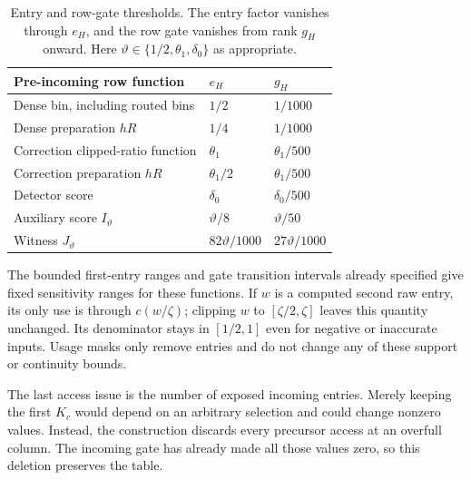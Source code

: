 \begin{table}[htbp]
\centering
\begin{tabular}{@{}lll@{}}
\toprule
Pre-incoming row function & $e_H$ & $g_H$ \\
\midrule
Dense bin, including routed bins & $1/2$ & $1/1000$ \\
Dense preparation $hR$ & $1/4$ & $1/1000$ \\
Correction clipped-ratio function & $\theta_1$ & $\theta_1/500$ \\
Correction preparation $hR$ & $\theta_1/2$ & $\theta_1/500$ \\
Detector score & $\delta_0$ & $\delta_0/500$ \\
Auxiliary score $I_{\vartheta}$ & $\vartheta/8$ & $\vartheta/50$ \\
Witness $J_{\vartheta}$ & $82\vartheta/1000$ & $27\vartheta/1000$ \\
\bottomrule
\end{tabular}
\caption{Entry and row-gate thresholds. The entry factor vanishes through
$e_H$, and the row gate vanishes from rank $g_H$ onward. Here
$\vartheta\in\{1/2,\theta_1,\delta_0\}$ as appropriate.}
\label{tab:atom-compression-thresholds}
\end{table}

The bounded first-entry ranges and gate transition intervals already
specified give fixed sensitivity ranges for these functions.  If $w$
is a computed second raw entry, its only use is through $c(w/\zeta)$;
clipping $w$ to $[\zeta/2,\zeta]$ leaves this quantity unchanged.
Its denominator stays in $[1/2,1]$ even for negative or inaccurate
inputs.  Usage masks only remove entries and do not change any of these
support or continuity bounds.

The last access issue is the number of exposed incoming entries. Merely keeping the first $K_c$ would depend on an arbitrary selection and could change nonzero values. Instead, the construction discards every precursor access at an overfull column. The incoming gate has already made all those values zero, so this deletion preserves the table.

